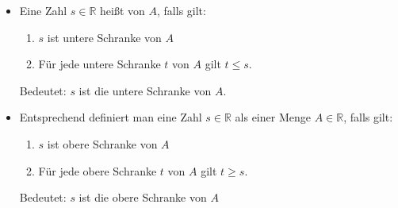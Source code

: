 

\begin{itemize}[label={},leftmargin=*]

    \item Eine Zahl $s \in \mathbb{R}$ heißt  von $A$, falls gilt:

        \begin{enumerate}
            \item $s$ ist untere Schranke von $A$
            \item Für jede untere Schranke $t$ von $A$ gilt $t \leq s$.
        \end{enumerate}

        Bedeutet: $s$ ist die  untere Schranke von $A$.
        
    \item Entsprechend definiert man eine Zahl $s \in \mathbb{R}$ als  einer Menge $A \in \mathbb{R}$, falls gilt:

        \begin{enumerate}
            \item $s$ ist obere Schranke von $A$
            \item Für jede obere Schranke $t$ von $A$ gilt $t \geq s$.
        \end{enumerate}

        Bedeutet: $s$ ist die  obere Schranke von $A$

\end{itemize}



